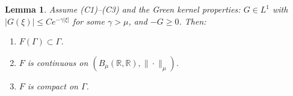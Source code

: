 \documentclass[12pt,letterpaper]{amsart}
\def\R{\mathbb R}
\newtheorem{lemma}[theorem]{Lemma}
\theoremstyle{definition}
\theoremstyle{remark}
\numberwithin{equation}{section}
\begin{document}
 
 
 
 \begin{lemma}\label{Sch1}
 	Assume (C1)--(C3) and the Green kernel properties: $G\in L^1$ with $|G(\xi)|\le C e^{-\gamma|\xi|}$ for some $\gamma>\mu$, and $-G\ge0$. Then:
 	\begin{enumerate}
 		\item $F(\Gamma)\subset\Gamma$.
 		\item $F$ is continuous on $(B_\mu(\mathbb R, \mathbb R),\|\cdot\|_\mu)$.
 		\item $F$ is compact on $\Gamma$.
 	\end{enumerate}
 \end{lemma}
% 	
% 	
% 
% 
 
  
 
 
% 
% 
%  
 
\end{document}
